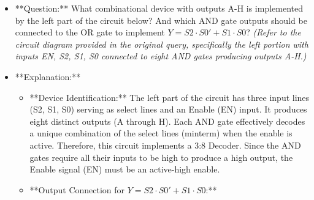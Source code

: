 \documentclass{article}
\begin{document}
\begin{itemize}
    \item **Question:** What combinational device with outputs A-H is implemented by the left part of the circuit below? And which AND gate outputs should be connected to the OR gate to implement $Y = S2 \cdot S0' + S1 \cdot S0$? \textit{ (Refer to the circuit diagram provided in the original query, specifically the left portion with inputs EN, S2, S1, S0 connected to eight AND gates producing outputs A-H.)}
    \item **Explanation:**
    
        \begin{itemize}
            \item **Device Identification:** The left part of the circuit has three input lines (S2, S1, S0) serving as select lines and an Enable (EN) input. It produces eight distinct outputs (A through H). Each AND gate effectively decodes a unique combination of the select lines (minterm) when the enable is active. Therefore, this circuit implements a 3:8 Decoder. Since the AND gates require all their inputs to be high to produce a high output, the Enable signal (EN) must be an active-high enable.
            \item **Output Connection for $Y = S2 \cdot S0' + S1 \cdot S0$:**
            
        \end{itemize}
\end{itemize}
\end{document}
